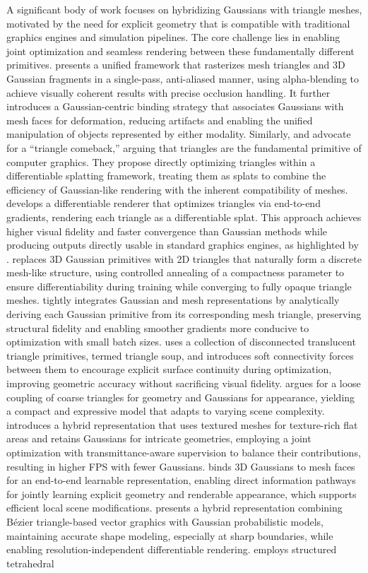\documentclass[11pt]{article}
\begin{document}
A significant body of work focuses on hybridizing Gaussians with triangle meshes, motivated by the need for explicit geometry that is compatible with traditional graphics engines and simulation pipelines. The core challenge lies in enabling joint optimization and seamless rendering between these fundamentally different primitives. \cite{ref84} presents a unified framework that rasterizes mesh triangles and 3D Gaussian fragments in a single-pass, anti-aliased manner, using alpha-blending to achieve visually coherent results with precise occlusion handling. It further introduces a Gaussian-centric binding strategy that associates Gaussians with mesh faces for deformation, reducing artifacts and enabling the unified manipulation of objects represented by either modality. Similarly, \cite{ref48} and \cite{ref85} advocate for a ``triangle comeback,'' arguing that triangles are the fundamental primitive of computer graphics. They propose directly optimizing triangles within a differentiable splatting framework, treating them as splats to combine the efficiency of Gaussian-like rendering with the inherent compatibility of meshes. \cite{ref86} develops a differentiable renderer that optimizes triangles via end-to-end gradients, rendering each triangle as a differentiable splat. This approach achieves higher visual fidelity and faster convergence than Gaussian methods while producing outputs directly usable in standard graphics engines, as highlighted by \cite{ref48}. \cite{ref85} replaces 3D Gaussian primitives with 2D triangles that naturally form a discrete mesh-like structure, using controlled annealing of a compactness parameter to ensure differentiability during training while converging to fully opaque triangle meshes. \cite{ref87} tightly integrates Gaussian and mesh representations by analytically deriving each Gaussian primitive from its corresponding mesh triangle, preserving structural fidelity and enabling smoother gradients more conducive to optimization with small batch sizes. \cite{ref88} uses a collection of disconnected translucent triangle primitives, termed triangle soup, and introduces soft connectivity forces between them to encourage explicit surface continuity during optimization, improving geometric accuracy without sacrificing visual fidelity. \cite{ref89} argues for a loose coupling of coarse triangles for geometry and Gaussians for appearance, yielding a compact and expressive model that adapts to varying scene complexity. \cite{ref47} introduces a hybrid representation that uses textured meshes for texture-rich flat areas and retains Gaussians for intricate geometries, employing a joint optimization with transmittance-aware supervision to balance their contributions, resulting in higher FPS with fewer Gaussians. \cite{ref90} binds 3D Gaussians to mesh faces for an end-to-end learnable representation, enabling direct information pathways for jointly learning explicit geometry and renderable appearance, which supports efficient local scene modifications. \cite{ref91} presents a hybrid representation combining Bézier triangle-based vector graphics with Gaussian probabilistic models, maintaining accurate shape modeling, especially at sharp boundaries, while enabling resolution-independent differentiable rendering. \cite{ref92} employs structured tetrahedral 
\end{document}
